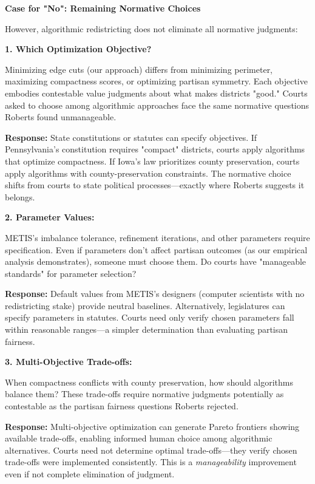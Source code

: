 \textbf{Case for "No": Remaining Normative Choices}

However, algorithmic redistricting does not eliminate all normative judgments:

\textbf{1. Which Optimization Objective?}

Minimizing edge cuts (our approach) differs from minimizing perimeter, maximizing compactness scores, or optimizing partisan symmetry. Each objective embodies contestable value judgments about what makes districts "good." Courts asked to choose among algorithmic approaches face the same normative questions Roberts found unmanageable.

\textbf{Response:} State constitutions or statutes can specify objectives. If Pennsylvania's constitution requires "compact" districts, courts apply algorithms that optimize compactness. If Iowa's law prioritizes county preservation, courts apply algorithms with county-preservation constraints. The normative choice shifts from courts to state political processes—exactly where Roberts suggests it belongs.

\textbf{2. Parameter Values:}

METIS's imbalance tolerance, refinement iterations, and other parameters require specification. Even if parameters don't affect partisan outcomes (as our empirical analysis demonstrates), someone must choose them. Do courts have "manageable standards" for parameter selection?

\textbf{Response:} Default values from METIS's designers (computer scientists with no redistricting stake) provide neutral baselines. Alternatively, legislatures can specify parameters in statutes. Courts need only verify chosen parameters fall within reasonable ranges—a simpler determination than evaluating partisan fairness.

\textbf{3. Multi-Objective Trade-offs:}

When compactness conflicts with county preservation, how should algorithms balance them? These trade-offs require normative judgments potentially as contestable as the partisan fairness questions Roberts rejected.

\textbf{Response:} Multi-objective optimization can generate Pareto frontiers showing available trade-offs, enabling informed human choice among algorithmic alternatives. Courts need not determine optimal trade-offs—they verify chosen trade-offs were implemented consistently. This is a \textit{manageability} improvement even if not complete elimination of judgment.

